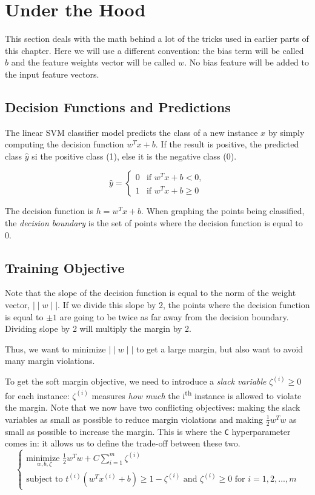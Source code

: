 \documentclass[letterpaper]{article}
\begin{document}
\section{Under the Hood}
This section deals with the math behind a lot of the tricks used in earlier parts of this chapter. Here we will use a different convention: the bias term will be called $b$ and the feature weights vector will be called $w$. No bias feature will be added to the input feature vectors. 

\subsection{Decision Functions and Predictions}
The linear SVM classifier model predicts the class of a new instance $x$ by simply computing the decision function $w^{T}x + b$. If the result is positive, the predicted class $\hat{y}$ si the positive class (1), else it is the negative class (0). 

$$ \hat{y} = 
\begin{cases}
0 & \text{if } w^{T}x + b < 0, \\
1 & \text{if } w^{T}x + b \geq 0
\end{cases}
$$

The decision function is $h = w^{T} x + b$. 
When graphing the points being classified, the \textsl{decision boundary} is the set of points where the decision function is equal to 0. 

\subsection{Training Objective}
Note that the slope of the decision function is equal to the norm of the weight vector, $\mid \mid w \mid \mid $. If we divide this slope by 2, the points where the decision function is equal to $\pm 1$ are going to be twice as far away from the decision boundary. Dividing slope by 2 will multiply the margin by 2. 

Thus, we want to minimize $\mid \mid w \mid \mid$ to get a large margin, but also want to avoid many margin violations. 

To get the soft margin objective, we need to introduce a \textsl{slack variable} $\zeta^{(i)} \geq 0$ for each instance: $\zeta^{(i)}$ measures \textsl{how much} the i\textsuperscript{th} instance is allowed to violate the margin. Note that we now have two conflicting objectives: making the slack variables as small as possible to reduce margin violations and making $\frac{1}{2} w^{T}w$ as small as possible to increase the margin. This is where the \texttt{C} hyperparameter comes in: it allows us to define the trade-off between these two. 
\newpage
$$
\begin{cases} 
\underset{w, b, \zeta}{\text{minimize }} \frac{1}{2}w^{T}w + C \sum_{i=1}^{m} \zeta^{(i)}  \\
\text{subject to } t^{(i)}(w^{T}x^{(i)} + b) \geq 1 - \zeta^{(i)} \text{ and } \zeta^{(i)} \geq 0 \text{ for } i = 1, 2, ..., m
\end{cases}
$$
\end{document}
